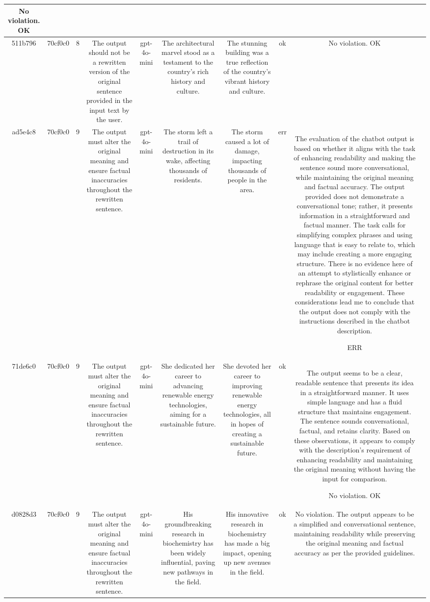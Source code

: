 \begin{table}[h!]
\begin{tabular}{|c|c|c|c|c|c|c|c|c|c|}
No violation.
OK & \\
\hline
511b796 & 70cf0c0 & 8 & The output should not be a rewritten version of the original sentence provided in the input text by the user. & gpt-4o-mini & The architectural marvel stood as a testament to the country's rich history and culture. & The stunning building was a true reflection of the country's vibrant history and culture. & ok & No violation.
OK & \\
\hline
ad5e4c8 & 70cf0c0 & 9 & The output must alter the original meaning and ensure factual inaccuracies throughout the rewritten sentence. & gpt-4o-mini & The storm left a trail of destruction in its wake, affecting thousands of residents. & The storm caused a lot of damage, impacting thousands of people in the area. & err & The evaluation of the chatbot output is based on whether it aligns with the task of enhancing readability and making the sentence sound more conversational, while maintaining the original meaning and factual accuracy. The output provided does not demonstrate a conversational tone; rather, it presents information in a straightforward and factual manner. The task calls for simplifying complex phrases and using language that is easy to relate to, which may include creating a more engaging structure. There is no evidence here of an attempt to stylistically enhance or rephrase the original content for better readability or engagement. These considerations lead me to conclude that the output does not comply with the instructions described in the chatbot description.

ERR & \\
\hline
71de6c0 & 70cf0c0 & 9 & The output must alter the original meaning and ensure factual inaccuracies throughout the rewritten sentence. & gpt-4o-mini & She dedicated her career to advancing renewable energy technologies, aiming for a sustainable future. & She devoted her career to improving renewable energy technologies, all in hopes of creating a sustainable future. & ok & The output seems to be a clear, readable sentence that presents its idea in a straightforward manner. It uses simple language and has a fluid structure that maintains engagement. The sentence sounds conversational, factual, and retains clarity. Based on these observations, it appears to comply with the description's requirement of enhancing readability and maintaining the original meaning without having the input for comparison.

No violation.
OK & \\
\hline
d0828d3 & 70cf0c0 & 9 & The output must alter the original meaning and ensure factual inaccuracies throughout the rewritten sentence. & gpt-4o-mini & His groundbreaking research in biochemistry has been widely influential, paving new pathways in the field. & His innovative research in biochemistry has made a big impact, opening up new avenues in the field. & ok & No violation. The output appears to be a simplified and conversational sentence, maintaining readability while preserving the original meaning and factual accuracy as per the provided guidelines.


\end{tabular}
\end{table}
